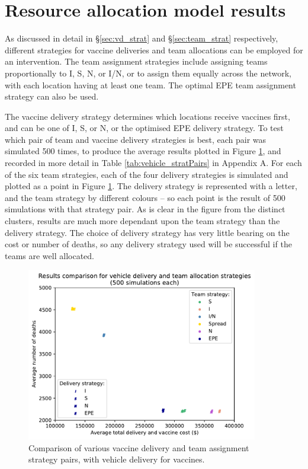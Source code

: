 \section{Resource allocation model results}
\label{sec:res_resAllocModel}
As discussed in detail in \S \ref{sec:vd_strat} and \S \ref{sec:team_strat} respectively, different strategies for vaccine deliveries and team allocations can be employed for an intervention. The team assignment strategies include assigning teams proportionally to I, S, N, or I/N, or to assign them equally across the network, with each location having at least one team. The optimal EPE team assignment strategy can also be used. 

The vaccine delivery strategy determines which locations receive vaccines first, and can be one of I, S, or N, or the optimised EPE delivery strategy. To test which pair of team and vaccine delivery strategies is best, each pair was simulated 500 times, to produce the average results plotted in Figure \ref{fig:res_teamScatter}, and recorded in more detail in Table \ref{tab:vehicle_stratPairs} in Appendix A. For each of the six team strategies, each of the four delivery strategies is simulated and plotted as a point in Figure \ref{fig:res_teamScatter}. The delivery strategy is represented with a letter, and the team strategy by different colours -- so each point is the result of 500 simulations with that strategy pair. As is clear in the figure from the distinct clusters, results are much more dependant upon the team strategy than the delivery strategy. The choice of delivery strategy has very little bearing on the cost or number of deaths, so any delivery strategy used will be successful if the teams are well allocated.

\begin{figure}[ht!]
    \centering
    \includegraphics[width=0.9\textwidth, trim={0 0 0 1.15cm}, clip]{teamAssScatter.pdf}
    \caption{Comparison of various vaccine delivery and team assignment strategy pairs, with vehicle delivery for vaccines.}
    \label{fig:res_teamScatter}
\end{figure}

